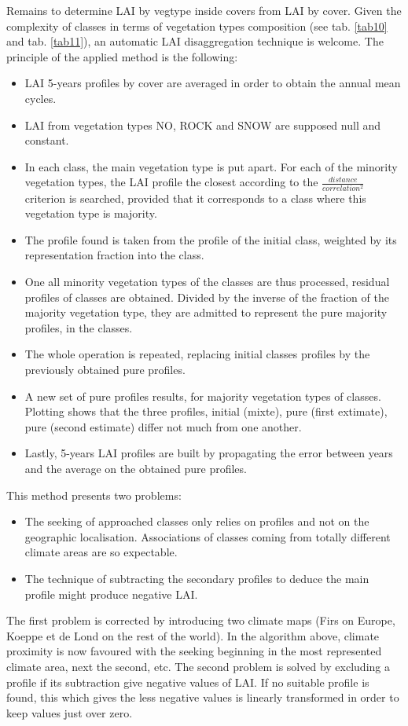 Remains to determine LAI by vegtype inside covers from LAI by cover. Given the complexity of classes in terms of vegetation types composition 
(see tab. \ref{tab10} and tab. \ref{tab11}), an automatic LAI disaggregation technique is welcome. The principle of the 
applied method is the following:
\begin{itemize}
\item{LAI 5-years profiles by cover are averaged in order to obtain the annual mean cycles.}
\item{LAI from vegetation types NO, ROCK and SNOW are supposed null and constant.}
\item{In each class, the main vegetation type is put apart. For each of the minority vegetation types, the LAI profile the closest 
according to the $\frac{distance}{correlation^{2}}$ criterion is searched, provided that it corresponds to a class where this vegetation type is 
majority. }
\item{The profile found is taken from the profile of the initial class, weighted by its representation fraction into the class.}
\item{One all minority vegetation types of the classes are thus processed, residual profiles of classes are obtained. Divided by 
the inverse of the fraction of the majority vegetation type, they are admitted to represent the pure majority profiles, in 
the classes.}
\item{The whole operation is repeated, replacing initial classes profiles by the previously obtained pure profiles.}
\item{A new set of pure profiles results, for majority vegetation types of classes. Plotting shows that the three profiles, initial 
(mixte), pure (first extimate), pure (second estimate) differ not much from one another. }
\item{Lastly, 5-years LAI profiles are built by propagating the error between years and the average on the obtained pure profiles.}
\end{itemize}
This method presents two problems: 
\begin{itemize}
\item{The seeking of approached classes only relies on profiles and not on the geographic localisation. Associations of classes coming 
from totally different climate areas are so expectable.}
\item{The technique of subtracting the secondary profiles to deduce the main profile might produce negative LAI.}
\end{itemize}
The first problem is corrected by introducing two climate maps (Firs on Europe, Koeppe et de Lond on the rest of the world). In the 
algorithm above, climate proximity is now favoured with the seeking beginning in the most represented climate area, next the second, etc. 
The second problem is solved by excluding a profile if its subtraction give negative values of LAI. If no suitable profile is found, this which gives 
the less negative values is linearly transformed in order to keep values just over zero. \\

